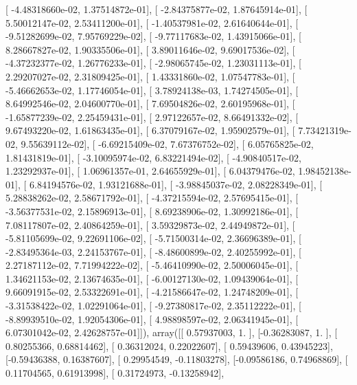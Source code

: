 \documentclass{article}
\begin{document}
       [ -4.48318660e-02,   1.37514872e-01],
       [ -2.84375877e-02,   1.87645914e-01],
       [  5.50012147e-02,   2.53411200e-01],
       [ -1.40537981e-02,   2.61640644e-01],
       [ -9.51282699e-02,   7.95769229e-02],
       [ -9.77117683e-02,   1.43915066e-01],
       [  8.28667827e-02,   1.90335506e-01],
       [  3.89011646e-02,   9.69017536e-02],
       [ -4.37232377e-02,   1.26776233e-01],
       [ -2.98065745e-02,   1.23031113e-01],
       [  2.29207027e-02,   2.31809425e-01],
       [  1.43331860e-02,   1.07547783e-01],
       [ -5.46662653e-02,   1.17746054e-01],
       [  3.78924138e-03,   1.74274505e-01],
       [  8.64992546e-02,   2.04600770e-01],
       [  7.69504826e-02,   2.60195968e-01],
       [ -1.65877239e-02,   2.25459431e-01],
       [  2.97122657e-02,   8.66491332e-02],
       [  9.67493220e-02,   1.61863435e-01],
       [  6.37079167e-02,   1.95902579e-01],
       [  7.73421319e-02,   9.55639112e-02],
       [ -6.69215409e-02,   7.67376752e-02],
       [  6.05765825e-02,   1.81431819e-01],
       [ -3.10095974e-02,   6.83221494e-02],
       [ -4.90840517e-02,   1.23292937e-01],
       [  1.06961357e-01,   2.64655929e-01],
       [  6.04379476e-02,   1.98452138e-01],
       [  6.84194576e-02,   1.93121688e-01],
       [ -3.98845037e-02,   2.08228349e-01],
       [  5.28838262e-02,   2.58671792e-01],
       [ -4.37215594e-02,   2.57695415e-01],
       [ -3.56377531e-02,   2.15896913e-01],
       [  8.69238906e-02,   1.30992186e-01],
       [  7.08117807e-02,   2.40864259e-01],
       [  3.59329873e-02,   2.44949872e-01],
       [ -5.81105699e-02,   9.22691106e-02],
       [ -5.71500314e-02,   2.36696389e-01],
       [ -2.83495364e-03,   2.24153767e-01],
       [ -8.48600899e-02,   2.40255992e-01],
       [  2.27187112e-02,   7.71994222e-02],
       [ -5.46410990e-02,   2.50006045e-01],
       [  1.34621153e-02,   2.13674635e-01],
       [ -6.00127130e-02,   1.09439064e-01],
       [  9.66091915e-02,   2.53322691e-01],
       [ -4.21586647e-02,   1.24748209e-01],
       [ -3.31538422e-02,   1.02291064e-01],
       [ -9.27380817e-02,   2.35112222e-01],
       [ -8.89939510e-02,   1.92054306e-01],
       [  4.98898597e-02,   2.06341945e-01],
       [  6.07301042e-02,   2.42628757e-01]]), array([[ 0.57937003,  1.        ],
       [-0.36283087,  1.        ],
       [ 0.80255366,  0.68814462],
       [ 0.36312024,  0.22022607],
       [ 0.59439606,  0.43945223],
       [-0.59436388,  0.16387607],
       [ 0.29954549, -0.11803278],
       [-0.09586186,  0.74968869],
       [ 0.11704565,  0.61913998],
       [ 0.31724973, -0.13258942],
\end{document}
